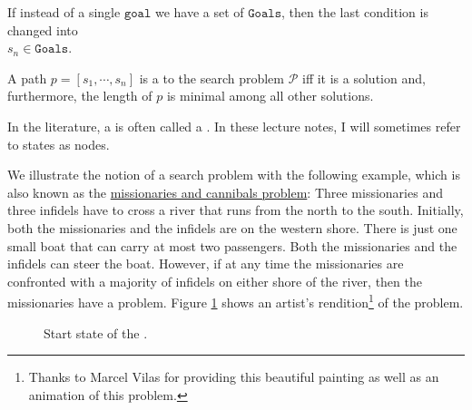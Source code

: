 \begin{Definition}
\begin{enumerate}
        If instead of a single $\texttt{goal}$ we have a set of $\texttt{Goals}$, then the last condition
        is changed into
        \\[0.2cm]
        \hspace*{1.3cm}
        $s_n \in \mathtt{Goals}$.
  \end{enumerate}
  A path $p = [s_1, \cdots, s_n]$ is a  to the search problem $\mathcal{P}$
  iff it is a solution and, furthermore, the length of $p$ is minimal among all other solutions. \eoxs
\end{Definition}

\remark
In the literature, a  is often called a .  
In these lecture notes, I will sometimes refer to states as nodes.  \eoxs

\example
We illustrate the notion of a search problem with the following example, which is also known as the
\href{https://en.wikipedia.org/wiki/Missionaries_and_cannibals_problem}{missionaries and cannibals problem}:
Three missionaries and three infidels have to cross a river that runs from the north to the south.
Initially, both the missionaries and the infidels are on the western shore.  There is just one small boat 
that can carry at most two passengers.  Both the missionaries and the infidels can steer the boat.
However, if at any time the missionaries are confronted with a majority of infidels on either shore of the
river, then the missionaries have a problem.  Figure \ref{fig:missionaries-and-infidels.pdf} shows an 
artist's rendition\footnote{Thanks to Marcel Vilas for providing this beautiful painting as well as an
  animation of this problem.}
of the problem.

\begin{figure}[!ht]
  \centering
  \caption{Start state of the .}
  \label{fig:missionaries-and-infidels.pdf}
\end{figure}


